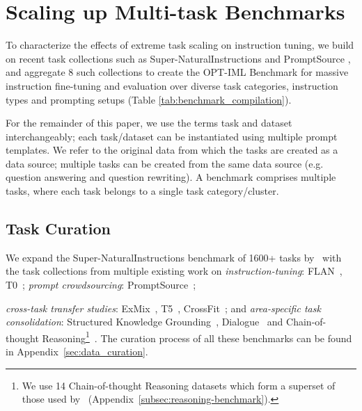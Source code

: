 \section{Scaling up Multi-task Benchmarks}
\label{sec:scaled-multi-task-benchmark}

To characterize the effects of extreme task scaling on instruction tuning, we build on recent task collections such as Super-NaturalInstructions \citep{wang2022niv2} and PromptSource \citep{sanh2021t0}, and aggregate 8 such collections to create the OPT-IML Benchmark for massive instruction fine-tuning and evaluation over diverse task categories, instruction types and prompting setups (Table \ref{tab:benchmark_compilation}). 

For the remainder of this paper, we use the terms task and dataset interchangeably; each task/dataset can be instantiated using multiple prompt templates. We refer to the original data from which the tasks are created as a data source; multiple tasks can be created from the same data source (e.g. question answering and question rewriting).  A benchmark comprises multiple tasks, where each task belongs to a single task category/cluster. 

\subsection{Task Curation}
\label{sec:unifying_benchmarks}
We expand the Super-NaturalInstructions benchmark of 1600+ tasks by~\citet{wang2022niv2} with the task collections from multiple existing work on \emph{instruction-tuning}: FLAN~\citep{wei2021flan}, \textsc{T0}~\citep{sanh2021t0}; \emph{prompt crowdsourcing}: PromptSource~\citep{bach2022promptsource};

\emph{cross-task transfer studies}: ExMix~\citep{aribandi2021ext5}, \textsc{T5}~\citep{raffel2020t5}, CrossFit~\citep{ye2021crossfit}; and \emph{area-specific task consolidation}: Structured Knowledge Grounding~\citep{xie2022unifiedskg}, Dialogue~\citep{shuster2022blenderbot} and Chain-of-thought Reasoning\footnote{We use 14 Chain-of-thought Reasoning datasets which form a superset of those used by~\cite{chung2022flanpalm} (Appendix~\ref{subsec:reasoning-benchmark}).}~\citep{chung2022flanpalm}. The curation process of all these benchmarks can be found in Appendix~\ref{sec:data_curation}. \\

